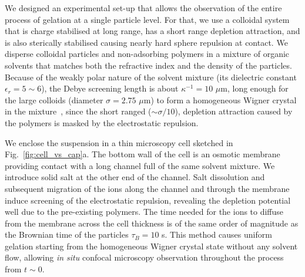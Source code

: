 \documentclass[preprint,footinbib,amsmath,amssymb,superscriptaddress]{revtex4}
\begin{document}




We designed an experimental set-up that allows the observation of the entire process of gelation at a single particle level. For that, we use a colloidal system that is charge stabilised at long range, has a short range depletion attraction, and is also sterically stabilised causing nearly hard sphere repulsion at contact. We disperse colloidal particles and non-adsorbing polymers in a  mixture of organic solvents that matches both the refractive index and the density of the particles. Because of the weakly polar nature of the solvent mixture (its dielectric constant $\epsilon_r = 5\sim6$), the Debye screening length is about $\kappa^{-1}=10$ $\mu$m, long enough for the large colloids (diameter $\sigma=2.75$ $\mu$m) to form a homogeneous Wigner crystal in the mixture~\cite{klix2010structural}, since the short ranged ($\sim \sigma/10$), depletion attraction caused by the polymers is masked by the electrostatic repulsion.

We enclose the suspension in a thin microscopy cell sketched in Fig.~\ref{fig:cell_vs_cap}a. The bottom wall of the cell is an osmotic membrane providing contact with a long channel full of the same solvent mixture. We introduce solid salt at the other end of the channel. Salt dissolution and subsequent migration of the ions along the channel and through the membrane induce screening of the electrostatic repulsion, revealing the depletion potential well due to the pre-existing polymers. The time needed for the ions to diffuse from the membrane across the cell thickness is of the same order of magnitude as the Brownian time of the particles $\tau_B=10$ s. This method causes uniform gelation starting from the homogeneous Wigner crystal state without any solvent flow, allowing \textit{in situ} confocal microscopy observation throughout the process from $t \sim 0$.
\end{document}
